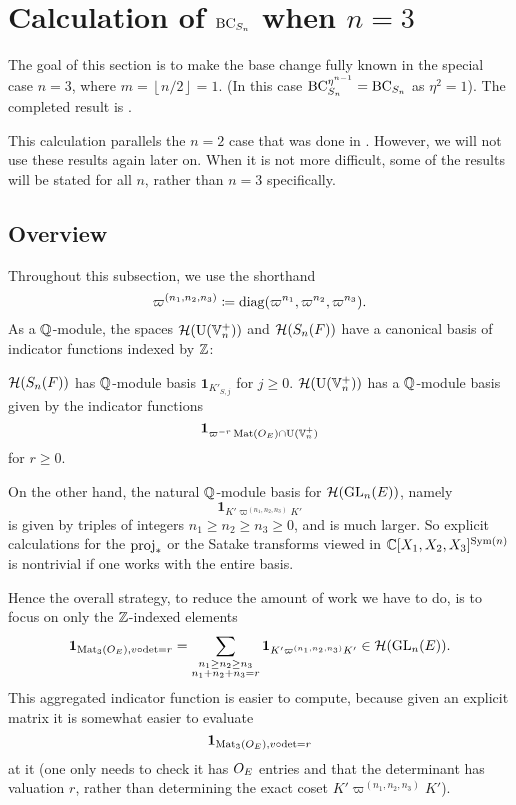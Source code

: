 \section{Calculation of $\operatorname{BC}_{S_n}$ when $n = 3$}
The goal of this section is to make the base change
fully known in the special case $n = 3$, where $m = \left\lfloor n/2 \right\rfloor = 1$.
(In this case $\operatorname{BC}_{S_n}^{\eta^{n-1}} = \operatorname{BC}_{S_n}$ as $\eta^2 = 1$).
The completed result is .

This calculation parallels the $n = 2$ case that was done in \cite[Lemma 7.1.1]{ref:AFLspherical}.
However, we will not use these results again later on.
When it is not more difficult, some of the results will be stated for all $n$,
rather than $n = 3$ specifically.

\subsection{Overview}
Throughout this subsection, we use the shorthand
\[ \varpi^{(n_1, n_2, n_3)} \coloneqq \operatorname{diag}(\varpi^{n_1}, \varpi^{n_2}, \varpi^{n_3}). \]
As a $\mathbb Q$-module, the spaces $\mathcal H(\operatorname{U}(\mathbb V_n^+))$ and $\mathcal H(S_n(F))$
have a canonical basis of indicator functions indexed by $\mathbb Z$:
\begin{itemize}
  \ii $\mathcal H(S_n(F))$ has $\mathbb Q$-module basis $\mathbf{1}_{K'_{S,j}}$ for $j \ge 0$.
  \ii $\mathcal H(\operatorname{U}(\mathbb V_n^+))$ has a $\mathbb Q$-module basis given by the indicator functions
  \[ \mathbf{1}_{\varpi^{-r} \operatorname{Mat}(O_E) \cap \operatorname{U}(\mathbb V_n^+)} \]
  for $r \ge 0$.
\end{itemize}
On the other hand, the natural $\mathbb Q$-module basis for $\mathcal H(\operatorname{GL}_n(E))$, namely
\[ \mathbf{1}_{K'\varpi^{(n_1, n_2, n_3)}K'} \]
is given by triples of integers $n_1 \ge n_2 \ge n_3 \ge 0$, and is much larger.
So explicit calculations for the $\operatorname{proj}_\ast$ or the Satake transforms viewed in
$\mathbb C[X_1, X_2, X_3]^{\operatorname{Sym}(n)}$ is nontrivial if one works with the entire basis.

Hence the overall strategy, to reduce the amount of work we have to do,
is to focus on only the $\mathbb Z$-indexed elements
\[
  \mathbf{1}_{\operatorname{Mat}_3(O_E), v\circ\det=r}
  = \sum_{\substack{n_1 \ge n_2 \ge n_3 \\ n_1 + n_2 + n_3 = r}}
  \mathbf{1}_{K'\varpi^{(n_1, n_2, n_3)}K'} \in \mathcal H(\operatorname{GL}_n(E)).
\]
This aggregated indicator function is easier to compute,
because given an explicit matrix it is somewhat easier
to evaluate \[ \mathbf{1}_{\operatorname{Mat}_3(O_E), v\circ\det=r} \]
at it (one only needs to check it has $O_E$ entries
and that the determinant has valuation $r$,
rather than determining the exact coset $K'\varpi^{(n_1, n_2, n_3)}K'$).

